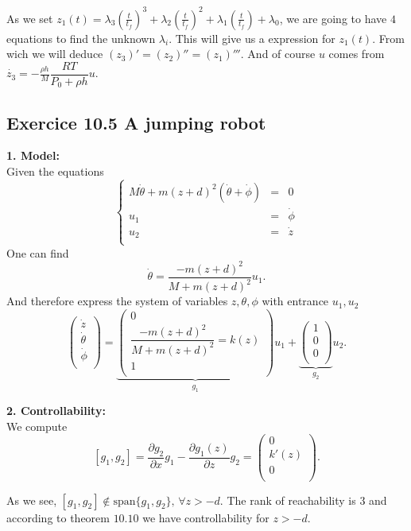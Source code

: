 As we set $z_{1}(t)=\lambda_{3}(\frac{t}{t_{f}})^{3}+\lambda_{2}(\frac{t}{t_{f}})^{2}+\lambda_{1}(\frac{t}{t_{f}})+\lambda_{0}$, we are going to have $4$ equations to find the unknown $\lambda_{i}$. This will give us a expression for $z_{1}(t)$. From wich we will deduce $(z_{3})'=(z_{2})''=(z_{1})'''$. And of course $u$ comes from $\dot{z_{3}}  =  -\frac{\rho h}{M}\dfrac{RT}{P_{0}+\rho h}u$.



\subsection*{Exercice 10.5 A jumping robot}

\textbf{1. Model:}\\

Given the equations 
$$\left\{ \begin{array}{rrr}
M\dot{\theta}+ m(z+d)^{2}(\dot{\theta}+\dot{\phi}) & = & 0\\
u_{1} & = & \dot{\phi}\\
u_{2} & = & \dot{z}\\
\end{array}\right.$$
One can find $$\dot{\theta}=\dfrac{-m(z+d)^{2}}{M+m(z+d)^{2}}u_{1}.$$
And therefore express the system of variables $z, \theta, \phi$ with entrance $u_{1}, u_{2}$
$$\begin{pmatrix}
\dot{z}\\
\dot{\theta}\\
\dot{\phi}\\
\end{pmatrix}=
\underbrace{
\begin{pmatrix}
0\\
\dfrac{-m(z+d)^{2}}{M+m(z+d)^{2}}=k(z)\\
1\\
\end{pmatrix}}_{g_{1}}u_{1}+
\underbrace{
\begin{pmatrix}
1\\
0\\
0\\
\end{pmatrix}}_{g_{2}}u_{2}.$$

\textbf{2. Controllability:}\\

We compute
$$[g_{1},g_{2}]=\dfrac{\partial g_{2}}{\partial x}g_{1}-\dfrac{\partial g_{1}(z)}{\partial z}g_{2}=\begin{pmatrix}
0\\
k'(z)\\
0\\
\end{pmatrix}.$$

As we see, $[g_{1},g_{2}]\notin \text{span}\{g_{1},g_{2}\}\text{, } \forall z>-d$. The rank of reachability is $3$ and according to theorem $10.10$ we have controllability for $z>-d$.

